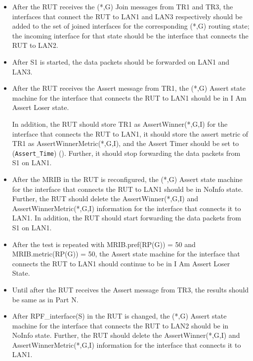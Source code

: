 \documentclass[11pt]{report}
\begin{document}

\begin{itemize}

  \item After the RUT receives the (*,G) Join messages from TR1 and TR3, the
  interfaces that connect the RUT to LAN1 and LAN3 respectively should be
  added to the set of joined interfaces for the corresponding (*,G) routing
  state; the incoming interface for that state should be the interface that
  connects the RUT to LAN2.

  \item After S1 is started, the data packets should be forwarded on LAN1 and
  LAN3.

  \item After the RUT receives the Assert message from TR1, the (*,G)
  Assert state machine for the interface that connects the RUT to LAN1 should
  be in I Am Assert Loser state.

  In addition, the RUT should store TR1 as AssertWinner(*,G,I) for the
  interface that connects the RUT to LAN1, it should store the assert metric
  of TR1 as AssertWinnerMetric(*,G,I), and the Assert Timer should be set to
  (\verb=Assert_Time=) ({\PimsmAssertTime}).
  Further, it should stop forwarding the data packets from S1 on LAN1.

  \item After the MRIB in the RUT is reconfigured, the (*,G)
  Assert state machine for the interface that connects the RUT to LAN1 should
  be in NoInfo state.
  Further, the RUT should delete the AssertWinner(*,G,I) and
  AssertWinnerMetric(*,G,I) information for the interface that connects it to
  LAN1.
  In addition, the RUT should start forwarding the data packets from S1 on
  LAN1.

  \item After the test is repeated with MRIB.pref(RP(G)) = 50
  and MRIB.metric(RP(G)) = 50, the Assert state machine for the interface that
  connects the RUT to LAN1 should continue to be in I Am Assert Loser State.

\end{itemize}


\begin{itemize}

  \item Until after the RUT receives the Assert message from TR3, the
  results should be same as in Part N.

  \item After RPF\_interface(S) in the RUT is changed, the (*,G)
  Assert state machine for the interface that connects the RUT to LAN2 should
  be in NoInfo state.
  Further, the RUT should delete the AssertWinner(*,G,I) and
  AssertWinnerMetric(*,G,I) information for the interface that connects it to
  LAN1.

\end{itemize}
\end{document}
